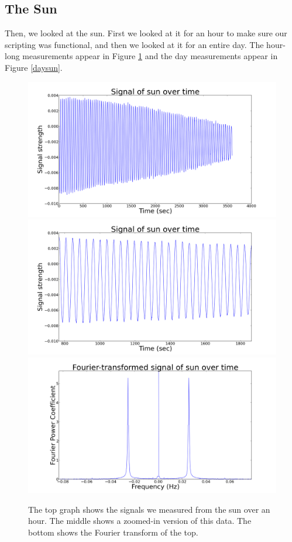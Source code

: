 \documentclass[11pt]{article}
\begin{document}
\subsection{The Sun}
Then, we looked at the sun. First we looked at it for an hour to make sure our scripting was functional, and then we looked at it for an entire day. The hour-long measurements appear in Figure \ref{hoursun} and the day measurements appear in Figure \ref{daysun}.

\begin{figure}
\centering
\includegraphics[scale=0.35]{garphs/sunhourvolt}
\includegraphics[scale=0.35]{garphs/sunhourzoom}
\includegraphics[scale=0.35]{garphs/sunhourfourier}
\caption{The top graph shows the signals we measured from the sun over an hour. The middle shows a zoomed-in version of this data. The bottom shows the Fourier transform of the top. \label{hoursun}}
\end{figure}
\end{document}
